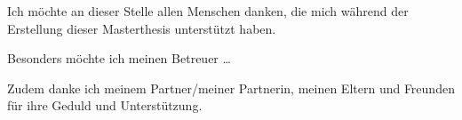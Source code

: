 
Ich möchte an dieser Stelle allen Menschen danken, die mich während der Erstellung dieser Masterthesis unterstützt haben.

Besonders möchte ich meinen Betreuer \dots

Zudem danke ich meinem Partner/meiner Partnerin, meinen Eltern und Freunden für ihre Geduld und Unterstützung.

\clearpage